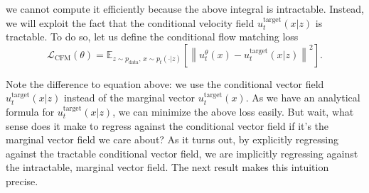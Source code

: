 we cannot compute it efficiently because the above integral is intractable. Instead, we will exploit the fact that the conditional velocity field $u_t^{\text{target}}(x|z)$ is tractable. To do so, let us define the conditional flow matching loss
\begin{equation}
\mathcal{L}_{\text{CFM}}(\theta) = \mathbb{E}_{z \sim p_{\text{data}},\, x \sim p_t(\cdot | z)} \left[ \left\| u_t^\theta(x) - u_t^{\text{target}}(x | z) \right\|^2 \right].
\end{equation}

Note the difference to equation above: we use the conditional vector field $u_t^{\text{target}}(x | z)$ instead of the marginal vector $u_t^{\text{target}}(x)$. As we have an analytical formula for $u_t^{\text{target}}(x | z)$, we can minimize the above loss easily. But wait, what sense does it make to regress against the conditional vector field if it's the marginal vector field we care about? As it turns out, by explicitly regressing against the tractable conditional vector field, we are implicitly regressing against the intractable, marginal vector field. The next result makes this intuition precise.

